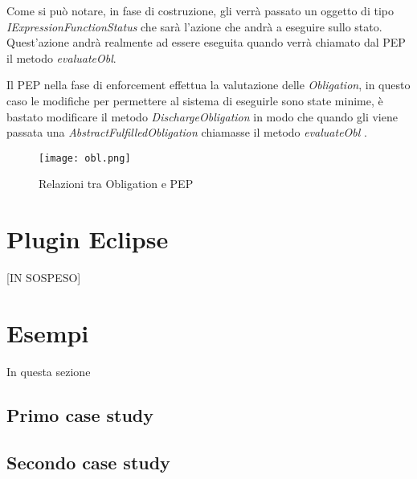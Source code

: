 Come si può notare, in fase di costruzione, gli verrà passato un oggetto di tipo \textit{IExpressionFunctionStatus} che sarà l'azione che andrà a eseguire sullo stato. Quest'azione andrà realmente ad essere eseguita quando verrà chiamato dal PEP il metodo \textit{evaluateObl}.\\ \par
Il PEP nella fase di enforcement effettua la valutazione delle \textit{Obligation}, in questo caso le modifiche per permettere al sistema di eseguirle sono state minime, è bastato modificare il metodo \textit{DischargeObligation} in modo che quando gli viene passata una \textit{AbstractFulfilledObligation} chiamasse il metodo \textit{evaluateObl} .
\begin{sidewaysfigure}
    \centering
	\texttt{[image: obl.png]}
    \caption{Relazioni tra Obligation e PEP}
    \label{fig:obl.png}
\end{sidewaysfigure}




\section{Plugin Eclipse}
\label{sec:plugin_eclipse}


[IN SOSPESO]


\section{Esempi}
\label{sec:implementazione_esempi}

In questa sezione 

\subsection{Primo case study}

\subsection{Secondo case study}